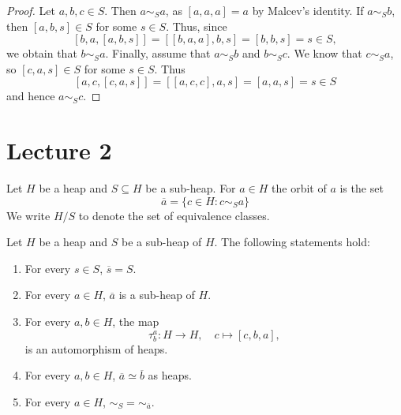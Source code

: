 \documentclass{svmult}
\begin{document}
\begin{proof}
    Let $a,b,c\in S$. Then $a\sim_S a$, as $[a,a,a]=a$ by Malcev's identity. 
    If $a\sim_S b$, then $[a,b,s]\in S$ for some $s\in S$. Thus, since 
    \[
    [b,a,[a,b,s]]=[[b,a,a],b,s]=[b,b,s]=s\in S,
    \]
    we obtain that $b\sim_S a$. 
    Finally, assume that $a\sim_S b$ and $b\sim_S c$. We know that 
    $c\sim_S a$, so 
    $[c,a,s]\in S$ for some $s\in S$. Thus 
    \[
    [a,c,[c,a,s]]=[[a,c,c],a,s]=[a,a,s]=s\in S
    \]
    and hence $a\sim_S c$. 
\end{proof}

\section{Lecture 2}

Let $H$ be a heap and $S\subseteq H$ be a sub-heap. For $a\in H$ 
the orbit of $a$ is the set
\[
\overline{a}=\{c\in H:c\sim_S a\}
\]
We write $H/S$ to denote the set
of equivalence classes.

\begin{theorem}
    Let $H$ be a heap and $S$ be a sub-heap of $H$. The following statements hold:
    \begin{enumerate}
        \item For every $s\in S$, $\overline{s}=S$. 
        \item For every $a\in H$, $\overline{a}$ is a sub-heap of $H$.
        \item For every $a,b\in H$, 
        the map
        \[
        \tau_b^a\colon H\to H,\quad
        c\mapsto [c,b,a],
        \]
        is an automorphism of heaps. 
        \item For every $a,b\in H$, 
        $\overline{a}\simeq\overline{b}$ as heaps. 
        \item For every $a\in H$, $\sim_S=\sim_{\overline{a}}$. 
    \end{enumerate}
\end{theorem}
\end{document}
